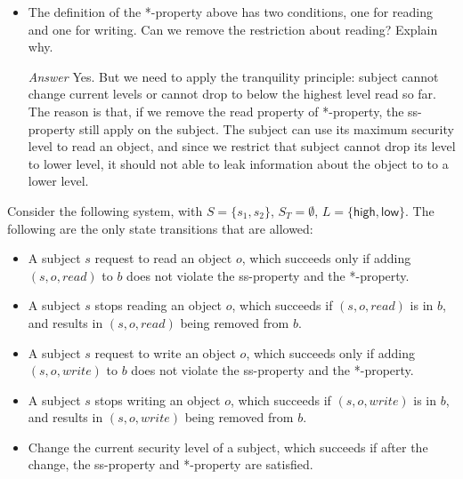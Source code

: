\documentclass[11pt]{article}
\newcommand{\rea}{read}
\newcommand{\wri}{write}
\begin{document}
\begin{description}
{\begin{itemize}
\begin{mdframed}
	If $S_T = \emptyset$, the *-property implies ss-property. Also, If we modify that *-property should apply to all subjects not just trusted subject, then *-property will imply ss-property.
\end{mdframed}
 \item
The definition of the *-property above has two conditions, one for reading and one
for writing.  Can we remove the restriction about reading?  Explain why.
\begin{mdframed}
	\textit{Answer} Yes. But we need to apply the tranquility principle: subject cannot change current levels or cannot drop to below the highest level read so far. The reason is that, if we remove the read property of *-property, the ss-property still apply on the subject. The subject can use its maximum security level to read an object, and since we restrict that subject cannot drop its level to lower level, it should not able to leak information about the object to to a lower level.
\end{mdframed}
\end{itemize}
}

Consider the following system, with $S=\{s_1,s_2\}$, $S_T=\emptyset$,
$L=\{\mathsf{high}, \mathsf{low}\}$.  The following are the only state transitions
that are allowed:

\begin{itemize}
 \item
A subject $s$ request to read an object $o$, which succeeds only if adding
$(s,o,\rea)$ to $b$ does not violate the ss-property and the *-property.

 \item
A subject $s$ stops reading an object $o$, which succeeds if $(s,o,\rea)$ is in $b$,
and results in $(s,o,\rea)$ being removed from $b$.

 \item
A subject $s$ request to write an object $o$, which succeeds only if adding
$(s,o,\wri)$ to $b$ does not violate the ss-property and the *-property.

 \item
A subject $s$ stops writing an object $o$, which succeeds if $(s,o,\wri)$ is in $b$,
and results in $(s,o,\wri)$ being removed from $b$.

 \item
Change the current security level of a subject, which succeeds if after the change,
the ss-property and *-property are satisfied.

\end{itemize}


\end{description}
\end{document}
